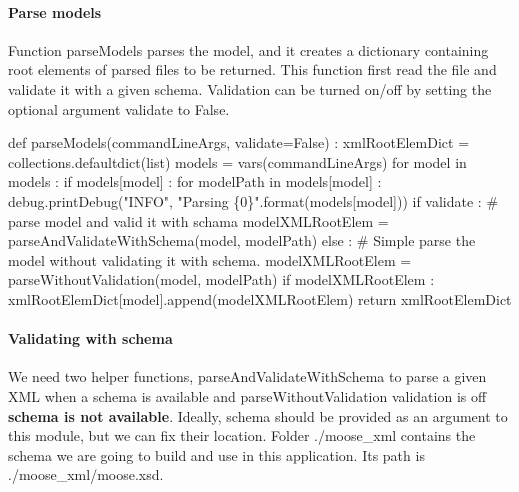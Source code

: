 \documentclass[]{article}%
\begin{document}
\paragraph{Parse models}

  Function {\Tt{}parseModels\nwendquote} parses the model, and it creates a dictionary
  containing root elements of parsed files to be returned. This function first
  read the file and validate it with a given schema. Validation can be turned
  on/off by setting the optional argument {\Tt{}validate\nwendquote} to {\Tt{}False\nwendquote}.

\nwenddocs{}\endmoddef\nwstartdeflinemarkup{}\nwenddeflinemarkup
def parseModels(commandLineArgs, validate=False) :
  xmlRootElemDict = collections.defaultdict(list)
  models = vars(commandLineArgs)
  for model in models :
    if models[model] :
      for modelPath in models[model] :
        debug.printDebug("INFO", "Parsing \{0\}".format(models[model]))
        if validate :
          # parse model and valid it with schama
          modelXMLRootElem = parseAndValidateWithSchema(model, modelPath)
        else :
          # Simple parse the model without validating it with schema.
          modelXMLRootElem = parseWithoutValidation(model, modelPath)
        if modelXMLRootElem :
          xmlRootElemDict[model].append(modelXMLRootElem)
  return xmlRootElemDict 

\nwendcode{} %

\paragraph{Validating with schema}

  We need two helper functions, {\Tt{}parseAndValidateWithSchema\nwendquote} to parse a given
  XML when a schema is available and {\Tt{}parseWithoutValidation\nwendquote} validation is
  off \textbf{schema is not available}. Ideally, schema should be provided as an
  argument to this module, but we can fix their location. Folder {\Tt{}./moose{\_}xml\nwendquote}
  contains the schema we are going to build and use in this application. Its
  path is {\Tt{}./moose{\_}xml/moose.xsd\nwendquote}.
\end{document}
